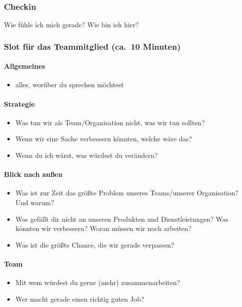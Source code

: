 \subsubsection{Checkin}
Wie fühle ich mich gerade? Wie bin ich hier?


\subsubsection{Slot für das Teammitglied (ca.~10 Minuten)}

\paragraph{Allgemeines}
\begin{itemize}
 \item alles, worüber du sprechen möchtest
\end{itemize}

\paragraph{Strategie}
\begin{itemize}
 \item Was tun wir als Team/Organisation nicht, was wir tun sollten?
 \item Wenn wir eine Sache verbessern könnten, welche wäre das?
 \item Wenn du ich wärst, was würdest du verändern?
\end{itemize}

\paragraph{Blick nach außen}
\begin{itemize}
 \item Was ist zur Zeit das größte Problem unseres Teams/unserer Organisation? Und warum?
 \item Was gefällt dir nicht an unseren Produkten und Dienstleistungen? Was könnten wir verbessern? Woran müssen wir noch arbeiten?
 \item Was ist die größte Chance, die wir gerade verpassen?
\end{itemize}

\paragraph{Team}
\begin{itemize}
 \item Mit wem würdest du gerne (mehr) zusammenarbeiten?
 \item Wer macht gerade einen richtig guten Job?
\end{itemize}

